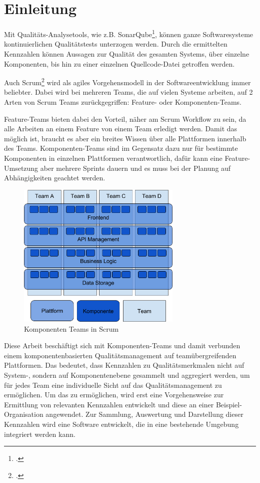 \chapter{Einleitung}

Mit Qualitäts-Analysetools, wie z.B. SonarQube\footcite{sonarqube}, können ganze Softwaresysteme kontinuierlichen Qualitätstests unterzogen werden.
Durch die ermittelten Kennzahlen können Aussagen zur Qualität des gesamten Systems, über einzelne Komponenten, bis hin zu einer einzelnen Quellcode-Datei getroffen werden.

Auch Scrum\footcite{scrum} wird als agiles Vorgehensmodell in der Softwareentwicklung immer beliebter. 
Dabei wird bei mehreren Teams, die auf vielen Systeme arbeiten, auf 2 Arten von Scrum Teams zurückgegriffen:
Feature- oder Komponenten-Teams.

Feature-Teams bieten dabei den Vorteil, näher am Scrum Workflow zu sein, da alle Arbeiten an einem Feature von einem Team erledigt werden. Damit das möglich ist, braucht es aber ein breites Wissen über alle Plattformen innerhalb des Teams.
Komponenten-Teams sind im Gegensatz dazu nur für bestimmte Komponenten in einzelnen Plattformen verantwortlich, dafür kann eine Feature-Umsetzung aber mehrere Sprints dauern und es muss bei der Planung auf Abhängigkeiten geachtet werden.

\begin{savenotes}
  \begin{figure}[H] 
    \centering
       \includegraphics[width=0.7\textwidth]{img/component-teams.png}
    \caption[Komponenten Teams in Scrum]{Komponenten Teams in Scrum}\label{fig:Komponenten Teams in Scrum}
  \end{figure}
\end{savenotes}

Diese Arbeit beschäftigt sich mit Komponenten-Teams und damit verbunden einem komponentenbasierten Qualitätsmanagement auf teamübergreifenden Plattformen.
Das bedeutet, dass Kennzahlen zu Qualitätsmerkmalen nicht auf System-, sondern auf Komponentenebene gesammelt und aggregiert werden, um für jedes Team eine individuelle Sicht auf das Qualitätsmanagement zu ermöglichen.
Um das zu ermöglichen, wird erst eine Vorgehensweise zur Ermittlung von relevanten Kennzahlen entwickelt und diese an einer Beispiel-Organisation angewendet.
Zur Sammlung, Auswertung und Darstellung dieser Kennzahlen wird eine Software entwickelt, die in eine bestehende Umgebung integriert werden kann.
